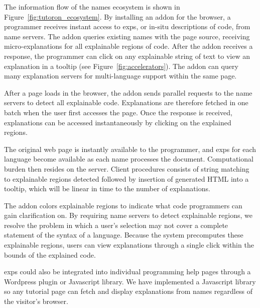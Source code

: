 The information flow of the \Glspl{name} ecosystem is shown in Figure~\ref{fig:tutoron_ecosystem}.
By installing an addon for the browser, a programmer receives instant access to \glspl{exp}, or in-situ descriptions of code, from \Gls{name} servers.
The addon queries existing \Glspl{name} with the page source, receiving micro-explanations for all explainable regions of code.
After the addon receives a response, the programmer can click on any explainable string of text to view an explanation in a tooltip (see Figure~\ref{fig:accelerators}).
The addon can query many explanation servers for multi-language support within the same page.


\begin{changes}
After a page loads in the browser, the addon sends parallel requests to the \Gls{name} servers to detect all explainable code.
Explanations are therefore fetched in one batch when the user first accesses the page.
Once the response is received, explanations can be accessed instantaneously by clicking on the explained regions.
\end{changes}
The original web page is instantly available to the programmer, and \glspl{exp} for each language become available as each \Gls{name} processes the document.
Computational burden then resides on the server.
 Client procedures consists of string matching to explainable regions detected followed by insertion of generated HTML into a tooltip, which will be linear in time to the number of explanations.\fi

\begin{changes}
The addon colors explainable regions to indicate what code programmers can gain clarification on.
By requiring \Gls{name} servers to detect explainable regions, we resolve the problem in which a user's selection may not cover a complete statement of the syntax of a language.
Because the system precomputes these explainable regions, users can view explanations through a single click within the bounds of the explained code.
\end{changes}
  \fi

\begin{changes}
\Glspl{exp} could also be integrated into individual programming help pages through a Wordpress plugin or Javascript library.
We have implemented a Javascript library so any tutorial page can fetch and display explanations from \Glspl{name} regardless of the visitor's browser.
\end{changes}

